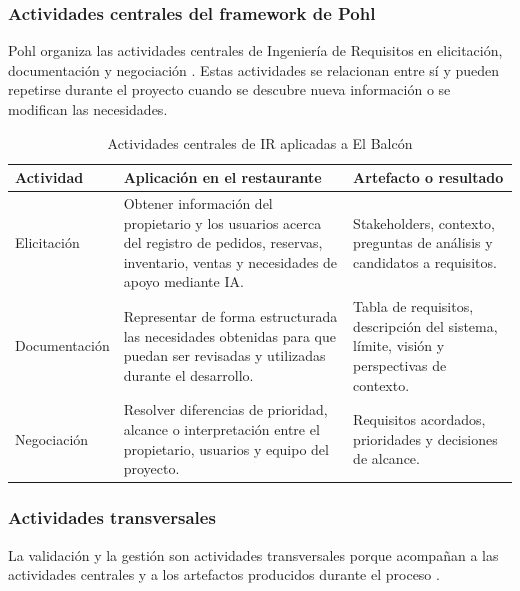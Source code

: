 \subsubsection{Actividades centrales del framework de Pohl}

Pohl organiza las actividades centrales de Ingeniería de Requisitos en
elicitación, documentación y negociación \cite{pohl2025}. Estas actividades
se relacionan entre sí y pueden repetirse durante el proyecto cuando se
descubre nueva información o se modifican las necesidades.

\begin{table}[H]
\centering
\footnotesize
\caption{Actividades centrales de IR aplicadas a El Balcón}
\label{tab:actividades-centrales}
\begin{tabularx}{\textwidth}{@{}p{}YY@{}}
\toprule
\textbf{Actividad} &
\textbf{Aplicación en el restaurante} &
\textbf{Artefacto o resultado} \\
\midrule

Elicitación &
Obtener información del propietario y los usuarios acerca del registro de
pedidos, reservas, inventario, ventas y necesidades de apoyo mediante IA. &
Stakeholders, contexto, preguntas de análisis y candidatos a requisitos. \\

Documentación &
Representar de forma estructurada las necesidades obtenidas para que puedan
ser revisadas y utilizadas durante el desarrollo. &
Tabla de requisitos, descripción del sistema, límite, visión y perspectivas
de contexto. \\

Negociación &
Resolver diferencias de prioridad, alcance o interpretación entre el
propietario, usuarios y equipo del proyecto. &
Requisitos acordados, prioridades y decisiones de alcance. \\

\bottomrule
\end{tabularx}
\end{table}

\subsubsection{Actividades transversales}

La validación y la gestión son actividades transversales porque acompañan a
las actividades centrales y a los artefactos producidos durante el proceso
\cite{pohl2025}.

